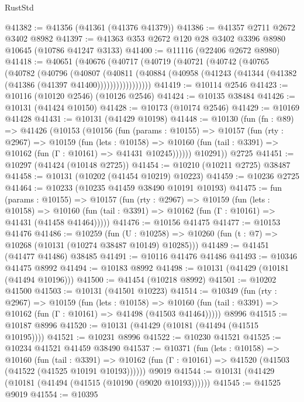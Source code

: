 \begin{lexlean}{RustStd}
\begin{coremodule}
@41382 := @41356 (@41361 (@41376 @41379))
@41386 := @41357 @2711 @2672 @3402 @8982
@41397 := @41363 @353 @2672 @120 @28 @3402 @3396 @8980 @10645 (@10786 @41247 @3133)
@41400 := @11116 (@22406 @2672 @8980)
@41418 := @40651
    (@40676
      (@40717
        (@40719
          (@40721
            (@40742
              (@40765
                (@40782
                  (@40796
                    (@40807
                      (@40811
                        (@40884
                          (@40958 (@41243 (@41344 (@41382 (@41386 (@41397 @41400)))))))))))))))))
@41419 := @10114 @2546
@41423 := @10116 (@10120 @2546) (@10126 @2546)
@41424 := @10135 @38484
@41426 := @10131 (@41424 @10150)
@41428 := @10173 (@10174 @2546)
@41429 := @10169 @41428
@41431 := @10131 (@41429 @10198)
@41448 := @10130
    (fun (fn : @89) =>
    @41426
      (@10153
        (@10156
          (fun (params : @10155) =>
          @10157
            (fun (rty : @2967) =>
            @10159
              (fun (lets : @10158) =>
              @10160 (fun (tail : @3391) => @10162 (fun (Γ : @10161) => @41431 @10245))))))
        @10291))
    @2725
@41451 := @10297 (@41424 (@10148 @2725))
@41454 := @10210 (@10211 @2725) @38487
@41458 := @10131 (@10202 (@41454 @10219) @10223)
@41459 := @10236 @2725
@41464 := @10233 (@10235 @41459 @38490 @10191 @10193)
@41475 := fun (params : @10155) =>
  @10157
    (fun (rty : @2967) =>
    @10159
      (fun (lets : @10158) =>
      @10160 (fun (tail : @3391) => @10162 (fun (Γ : @10161) => @41431 (@41458 @41464)))))
@41476 := @10156 @41475
@41477 := @10153 @41476
@41486 := @10259
    (fun (U : @10258) => @10260 (fun (t : @7) => @10268 (@10131 (@10274 @38487 @10149) @10285)))
@41489 := @41451 (@41477 @41486) @38485
@41491 := @10116 @41476 @41486
@41493 := @10346 @41475 @8992
@41494 := @10183 @8992
@41498 := @10131 (@41429 (@10181 (@41494 @10196)))
@41500 := @41454 (@10218 @8992)
@41501 := @10202 @41500
@41503 := @10131 (@41501 @10223)
@41514 := @10349
    (fun (rty : @2967) =>
    @10159
      (fun (lets : @10158) =>
      @10160 (fun (tail : @3391) => @10162 (fun (Γ : @10161) => @41498 (@41503 @41464)))))
    @8996
@41515 := @10187 @8996
@41520 := @10131 (@41429 (@10181 (@41494 (@41515 @10195))))
@41521 := @10231 @8996
@41522 := @10230 @41521
@41525 := @10234 @41521 @41459 @38490
@41537 := @10371
    (fun (lets : @10158) =>
    @10160
      (fun (tail : @3391) =>
      @10162 (fun (Γ : @10161) => @41520 (@41503 (@41522 (@41525 @10191 @10193))))))
    @9019
@41544 := @10131 (@41429 (@10181 (@41494 (@41515 (@10190 (@9020 @10193))))))
@41545 := @41525 @9019
@41554 := @10395

\end{coremodule}
\end{lexlean}
